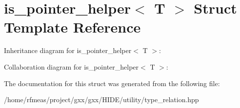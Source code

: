 \hypertarget{structis__pointer__helper}{}\section{is\+\_\+pointer\+\_\+helper$<$ T $>$ Struct Template Reference}
\label{structis__pointer__helper}


Inheritance diagram for is\+\_\+pointer\+\_\+helper$<$ T $>$\+:


Collaboration diagram for is\+\_\+pointer\+\_\+helper$<$ T $>$\+:


The documentation for this struct was generated from the following file\+:\begin{DoxyCompactItemize}
\item 
/home/rfmeas/project/gxx/gxx/\+H\+I\+D\+E/utility/type\+\_\+relation.\+hpp\end{DoxyCompactItemize}
